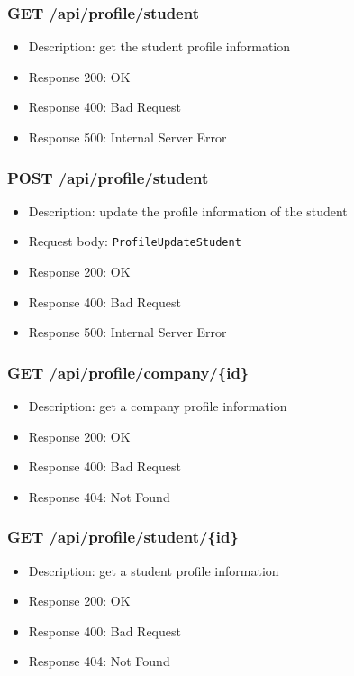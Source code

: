\subsubsection{GET /api/profile/student}
\begin{itemize}
    \item Description: get the student profile information
    \item Response 200: OK
    \item Response 400: Bad Request
    \item Response 500: Internal Server Error
\end{itemize}

\subsubsection{POST /api/profile/student}
\begin{itemize}
    \item Description: update the profile information of the student
    \item Request body: \verb|ProfileUpdateStudent|
    \item Response 200: OK
    \item Response 400: Bad Request
    \item Response 500: Internal Server Error
\end{itemize}

\subsubsection{GET /api/profile/company/\{id\}}
\begin{itemize}
    \item Description: get a company profile information
    \item Response 200: OK
    \item Response 400: Bad Request
    \item Response 404: Not Found
\end{itemize}

\subsubsection{GET /api/profile/student/\{id\}}
\begin{itemize}
    \item Description: get a student profile information
    \item Response 200: OK
    \item Response 400: Bad Request
    \item Response 404: Not Found
\end{itemize}

